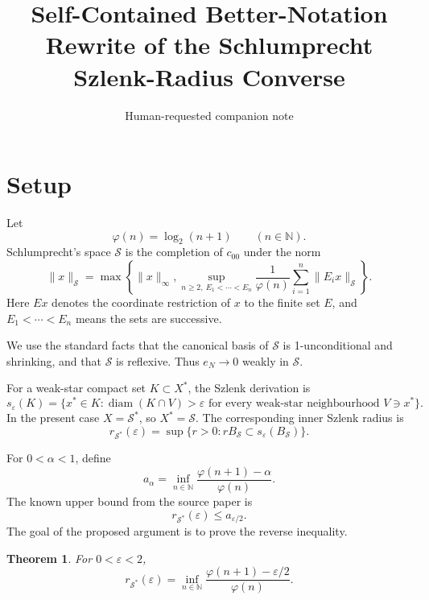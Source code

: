 \documentclass[11pt]{article}
\title{Self-Contained Better-Notation Rewrite of the Schlumprecht Szlenk-Radius Converse}
\author{Human-requested companion note}
\date{}
\newcommand{\ph}{\varphi}
\newcommand{\N}{\mathbb N}
\newcommand{\Ssp}{\mathcal S}
\newcommand{\Ball}{B}
\newtheorem*{theorem*}{Theorem}
\begin{document}
\maketitle

\begin{center}
\end{center}

\section{Setup}

Let
\[
 \ph(n)=\log_2(n+1)
 \qquad (n\in\N).
\]
Schlumprecht's space \(\Ssp\) is the completion of \(c_{00}\) under the norm
\[
 \|x\|_{\Ssp}
 =
 \max\left\{
 \|x\|_\infty,
 \sup_{n\ge 2,\ E_1<\cdots<E_n}
 \frac{1}{\ph(n)}
 \sum_{i=1}^n \|E_i x\|_{\Ssp}
 \right\}.
\]
Here \(E x\) denotes the coordinate restriction of \(x\) to the finite set
\(E\), and \(E_1<\cdots<E_n\) means the sets are successive.

We use the standard facts that the canonical basis of \(\Ssp\) is
1-unconditional and shrinking, and that \(\Ssp\) is reflexive.  Thus
\(e_N\to 0\) weakly in \(\Ssp\).

For a weak-star compact set \(K\subset X^*\), the Szlenk derivation is
\[
 s_\varepsilon(K)
 =
 \{x^*\in K:
 \operatorname{diam}(K\cap V)>\varepsilon
 \text{ for every weak-star neighbourhood }V\ni x^*\}.
\]
In the present case \(X=\Ssp^*\), so \(X^*=\Ssp\).  The corresponding
inner Szlenk radius is
\[
 r_{\Ssp^*}(\varepsilon)
 =
 \sup\{r>0:r\Ball_{\Ssp}\subset s_\varepsilon(\Ball_{\Ssp})\}.
\]

For \(0<\alpha<1\), define
\[
 a_\alpha
 =
 \inf_{n\in\N}
 \frac{\ph(n+1)-\alpha}{\ph(n)}.
\]
The known upper bound from the source paper is
\[
 r_{\Ssp^*}(\varepsilon)
 \le
 a_{\varepsilon/2}.
\]
The goal of the proposed argument is to prove the reverse inequality.

\begin{theorem*}
For \(0<\varepsilon<2\),
\[
 r_{\Ssp^*}(\varepsilon)
 =
 \inf_{n\in\N}
 \frac{\ph(n+1)-\varepsilon/2}{\ph(n)}.
\]
\end{theorem*}
\end{document}
